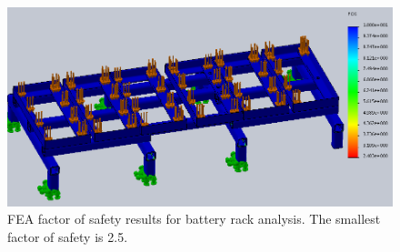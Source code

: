 \begin{figure}[H]
\centering
\includegraphics[width=\textwidth]{images/updated_battery_rack_FOS}
\caption[Battery Rack FEA factor of safety Results]{FEA factor of safety results for battery rack analysis. The smallest factor of safety is 2.5.}
\label{fig:battery_rack_disp_fea}
\end{figure}


